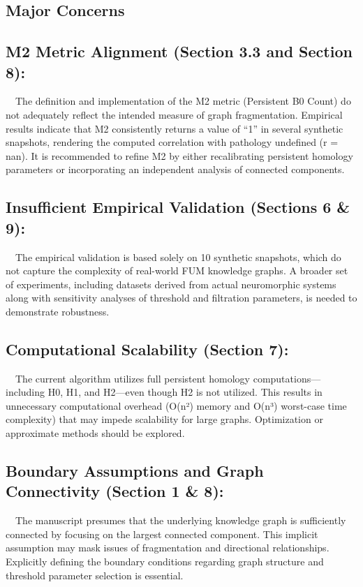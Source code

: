 \documentclass[12pt]{article}
\begin{document}
\hrulefill
\subsection{Major Concerns}

\subsection{M2 Metric Alignment (Section 3.3 and Section 8):  }
 The definition and implementation of the M2 metric (Persistent B0 Count) do not adequately reflect the intended measure of graph fragmentation. Empirical results indicate that M2 consistently returns a value of “1” in several synthetic snapshots, rendering the computed correlation with pathology undefined (r = nan). It is recommended to refine M2 by either recalibrating persistent homology parameters or incorporating an independent analysis of connected components.

\subsection{Insufficient Empirical Validation (Sections 6 \& 9):  }
 The empirical validation is based solely on 10 synthetic snapshots, which do not capture the complexity of real-world FUM knowledge graphs. A broader set of experiments, including datasets derived from actual neuromorphic systems along with sensitivity analyses of threshold and filtration parameters, is needed to demonstrate robustness.

\subsection{Computational Scalability (Section 7):  }
 The current algorithm utilizes full persistent homology computations—including H0, H1, and H2—even though H2 is not utilized. This results in unnecessary computational overhead (O(n²) memory and O(n³) worst-case time complexity) that may impede scalability for large graphs. Optimization or approximate methods should be explored.

\subsection{Boundary Assumptions and Graph Connectivity (Section 1 \& 8):  }
 The manuscript presumes that the underlying knowledge graph is sufficiently connected by focusing on the largest connected component. This implicit assumption may mask issues of fragmentation and directional relationships. Explicitly defining the boundary conditions regarding graph structure and threshold parameter selection is essential.
\end{document}
